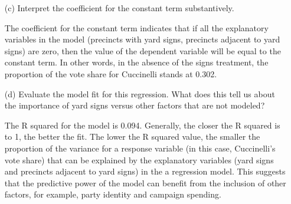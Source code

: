 \documentclass[12pt,letterpaper]{article}
\begin{document}
\begin{enumerate}
	\vspace{0.7cm}
	\item [(c)] Interpret the coefficient for the constant term substantively.
	\vspace{0.5cm}

\noindent The coefficient for the constant term indicates that if all the explanatory variables in the model (precincts with yard signs, precincts adjacent to yard signs) are zero, then the value of the dependent variable will be equal to the constant term. In other words, in the absence of the signs treatment, the proportion of the vote share for Cuccinelli stands at 0.302. 
	
	\item [(d)] Evaluate the model fit for this regression.  What does this	tell us about the importance of yard signs versus other factors that are not modeled?

\noindent The R squared for the model is 0.094. Generally, the closer the R squared is to 1, the better the fit. The lower the R squared value, the smaller the proportion of the variance for a response variable (in this case, Cuccinelli's vote share) that can be explained by the explanatory variables (yard signs and precincts adjacent to yard signs) in the a regression model. This suggests that the predictive power of the model can benefit from the inclusion of other factors, for example, party identity and campaign spending.
	
\end{enumerate}  
\end{document}
